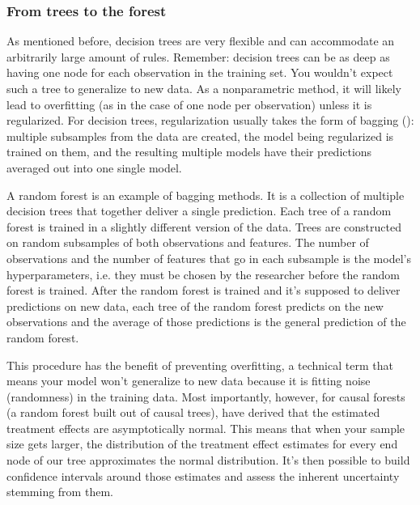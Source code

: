 \subsubsection{From trees to the forest}

As mentioned before, decision trees are very flexible and can accommodate an arbitrarily large amount of rules. Remember: decision trees can be as deep as having one node for each observation in the training set. You wouldn't expect such a tree to generalize to new data. %
As a nonparametric method, it will likely lead to overfitting (as in the case of one node per observation) unless it is regularized. For decision trees, regularization usually takes the form of bagging (\cite{breimanHeuristicsInstabilityStabilization1996}): multiple subsamples from the data are created, the model being regularized is trained on them, and the resulting multiple models have their predictions averaged out into one single model.

A random forest is an example of bagging methods. It is a collection of multiple decision trees that together deliver a single prediction. Each tree of a random forest is trained in a slightly different version of the data. Trees are constructed on random subsamples of both observations and features. The number of observations and the number of features that go in each subsample is the model's hyperparameters, i.e. they must be chosen by the researcher before the random forest is trained. After the random forest is trained and it's supposed to deliver predictions on new data, each tree of the random forest predicts on the new observations and the average of those predictions is the general prediction of the random forest.

This procedure has the benefit of preventing overfitting, a technical term that means your model won't generalize to new data because it is fitting noise (randomness) in the training data. Most importantly, however, for causal forests (a random forest built out of causal trees), \cite{atheyGeneralizedRandomForests2016} have derived that the estimated treatment effects are asymptotically normal. This means that when your sample size gets larger, the distribution of the treatment effect estimates for every end node of our tree approximates the normal distribution. It's then possible to build confidence intervals around those estimates and assess the inherent uncertainty stemming from them.

\newpage
